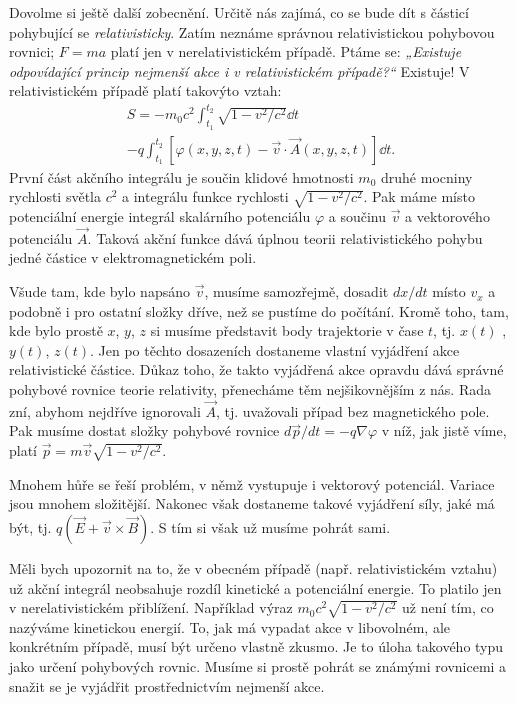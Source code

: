     Dovolme si ještě další zobecnění. Určitě nás zajímá, co se bude dít s částicí pohybující se
    \emph{relativisticky}. Zatím neznáme správnou relativistickou pohybovou rovnici; \(F= ma\) platí
    jen v nerelativistickém případě. Ptáme se: \emph{„Existuje odpovídající princip nejmenší akce i
    v relativistickém případě?“} Existuje! V relativistickém případě platí takovýto vztah:
    \begin{multline}
      S = -m_0c^2\int_{t_1}^{t_2}\sqrt{1-{v^2}/{c^2}}\dd{t} \\
          -q\int_{t_1}^{t_2}[\varphi(x,y,z,t)-\vec{v}\cdot\vec{A}(x,y,z,t)]\dd{t}.
    \end{multline}
    První část akčního integrálu je součin klidové hmotnosti \(m_0\) druhé mocniny rychlosti světla
    \(c^2\) a integrálu funkce rychlosti \(\sqrt{1 - v^2/c^2}\). Pak máme místo potenciální energie
    integrál skalárního potenciálu \(\varphi\) a součinu \(\vec{v}\) a vektorového potenciálu
    \(\vec{A}\). Taková akční funkce dává úplnou teorii relativistického pohybu jedné částice v
    elektromagnetickém poli.

    Všude tam, kde bylo napsáno \(\vec{v}\), musíme samozřejmě, dosadit \(dx/dt\) místo \(v_x\) a
    podobně i pro ostatní složky dříve, než se pustíme do počítání. Kromě toho, tam, kde bylo prostě
    \(x\), \(y\), \(z\) si musíme představit body trajektorie v čase \(t\), tj. \(x(t)\) ,\(y(t)\),
    \(z(t)\). Jen po těchto dosazeních dostaneme vlastní vyjádření akce relativistické částice.
    Důkaz toho, že takto vyjádřená akce opravdu dává správné pohybové rovnice teorie relativity,
    přenecháme těm nejšikovnějším z nás. Rada zní, abyhom nejdříve ignorovali \(\vec{A}\), tj.
    uvažovali případ bez magnetického pole. Pak musíme dostat složky pohybové rovnice \(d\vec{p}/dt=
    - q\nabla\varphi\) v níž, jak jistě víme, platí \(\vec{p} = m\vec{v}\sqrt{1 - v^2/c^2}\).

    Mnohem hůře se řeší problém, v němž vystupuje i vektorový potenciál. Variace jsou mnohem
    složitější. Nakonec však dostaneme takové vyjádření síly, jaké má být, tj. \(q(\vec{E} +
    \vec{v}\times \vec{B})\). S tím si však už musíme pohrát sami.

    Měli bych upozornit na to, že v obecném případě (např. relativistickém vztahu) už akční
    integrál neobsahuje rozdíl kinetické a potenciální energie. To platilo jen v nerelativistickém
    přiblížení. Například výraz \(m_0c^2\sqrt{1- v^2/c^2}\) už není tím, co nazýváme kinetickou
    energií. To, jak má vypadat akce v libovolném, ale konkrétním případě, musí být určeno vlastně
    zkusmo. Je to úloha takového typu jako určení pohybových rovnic. Musíme si prostě pohrát se
    známými rovnicemi a snažit se je vyjádřit prostřednictvím nejmenší akce.

